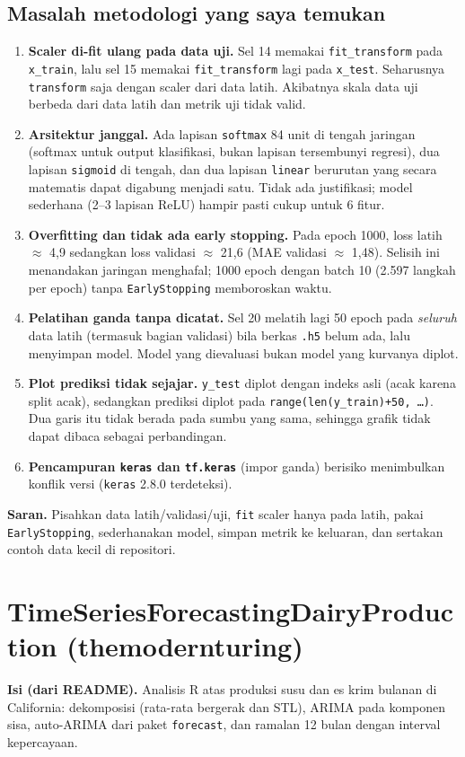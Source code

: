 \documentclass[11pt,a4paper]{article}
\begin{document}
\subsection*{Masalah metodologi yang saya temukan}
\begin{enumerate}
  \item \textbf{Scaler di-fit ulang pada data uji.} Sel 14 memakai \texttt{fit\_transform} pada \texttt{x\_train}, lalu sel 15 memakai \texttt{fit\_transform} lagi pada \texttt{x\_test}. Seharusnya \texttt{transform} saja dengan scaler dari data latih. Akibatnya skala data uji berbeda dari data latih dan metrik uji tidak valid.
  \item \textbf{Arsitektur janggal.} Ada lapisan \texttt{softmax} 84 unit di tengah jaringan (softmax untuk output klasifikasi, bukan lapisan tersembunyi regresi), dua lapisan \texttt{sigmoid} di tengah, dan dua lapisan \texttt{linear} berurutan yang secara matematis dapat digabung menjadi satu. Tidak ada justifikasi; model sederhana (2--3 lapisan ReLU) hampir pasti cukup untuk 6 fitur.
  \item \textbf{Overfitting dan tidak ada early stopping.} Pada epoch 1000, loss latih $\approx$ 4,9 sedangkan loss validasi $\approx$ 21,6 (MAE validasi $\approx$ 1,48). Selisih ini menandakan jaringan menghafal; 1000 epoch dengan batch 10 (2.597 langkah per epoch) tanpa \texttt{EarlyStopping} memboroskan waktu.
  \item \textbf{Pelatihan ganda tanpa dicatat.} Sel 20 melatih lagi 50 epoch pada \emph{seluruh} data latih (termasuk bagian validasi) bila berkas \texttt{.h5} belum ada, lalu menyimpan model. Model yang dievaluasi bukan model yang kurvanya diplot.
  \item \textbf{Plot prediksi tidak sejajar.} \texttt{y\_test} diplot dengan indeks asli (acak karena split acak), sedangkan prediksi diplot pada \texttt{range(len(y\_train)+50, \ldots)}. Dua garis itu tidak berada pada sumbu yang sama, sehingga grafik tidak dapat dibaca sebagai perbandingan.
  \item \textbf{Pencampuran \texttt{keras} dan \texttt{tf.keras}} (impor ganda) berisiko menimbulkan konflik versi (\texttt{keras} 2.8.0 terdeteksi).
\end{enumerate}

\textbf{Saran.} Pisahkan data latih/validasi/uji, \texttt{fit} scaler hanya pada latih, pakai \texttt{EarlyStopping}, sederhanakan model, simpan metrik ke keluaran, dan sertakan contoh data kecil di repositori.

\section{TimeSeriesForecastingDairyProduction (themodernturing)}
\textbf{Isi (dari README).} Analisis R atas produksi susu dan es krim bulanan di California: dekomposisi (rata-rata bergerak dan STL), ARIMA pada komponen sisa, auto-ARIMA dari paket \texttt{forecast}, dan ramalan 12 bulan dengan interval kepercayaan.
\end{document}
